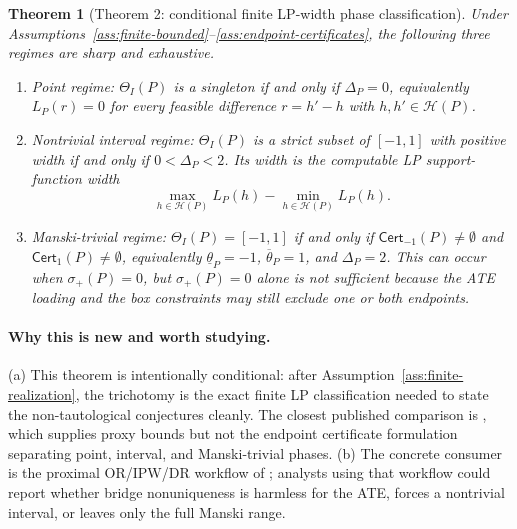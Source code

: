 \documentclass[11pt]{article}
\newcommand{\calH}{\mathcal{H}}
\theoremstyle{definition}
\theoremstyle{plain}
\newtheorem{theorem}{Theorem}
\theoremstyle{remark}
\begin{document}
\begin{theorem}[Theorem 2: conditional finite LP-width phase classification]\label{thm:phase-classification}
Under Assumptions~\ref{ass:finite-bounded}--\ref{ass:endpoint-certificates}, the
following three regimes are sharp and exhaustive.
\begin{enumerate}[label=(\roman*)]
\item Point regime: \(\Theta_I(P)\) is a singleton if and only if
\(\Delta_P=0\), equivalently \(L_P(r)=0\) for every feasible difference
\(r=h'-h\) with \(h,h'\in\calH(P)\).
\item Nontrivial interval regime: \(\Theta_I(P)\) is a strict subset of
\([-1,1]\) with positive width if and only if \(0<\Delta_P<2\).  Its width is
the computable LP support-function width
\[
\max_{h\in\calH(P)}L_P(h)-\min_{h\in\calH(P)}L_P(h).
\]
\item Manski-trivial regime: \(\Theta_I(P)=[-1,1]\) if and only if
\(\mathsf{Cert}_{-1}(P)\neq\emptyset\) and
\(\mathsf{Cert}_{1}(P)\neq\emptyset\), equivalently
\(\underline\theta_P=-1\), \(\overline\theta_P=1\), and
\(\Delta_P=2\).  This can occur when \(\sigma_+(P)=0\), but
\(\sigma_+(P)=0\) alone is not sufficient because the ATE loading and the box
constraints may still exclude one or both endpoints.
\end{enumerate}
\end{theorem}
\paragraph{Why this is new and worth studying.}
(a) This theorem is intentionally conditional: after
Assumption~\ref{ass:finite-realization}, the trichotomy is the exact finite
LP classification needed to state the non-tautological conjectures cleanly.
The closest published comparison is
\citet{GhassamiShpitserTchetgen2023ProxyPI}, which supplies proxy bounds but
not the endpoint certificate formulation separating point, interval, and
Manski-trivial phases.  (b) The concrete consumer is the proximal OR/IPW/DR
workflow of \citet{CuiPuShiMiaoTchetgen2024JASA}; analysts using that
workflow could report whether bridge nonuniqueness is harmless for the ATE,
forces a nontrivial interval, or leaves only the full Manski range.
\end{document}

